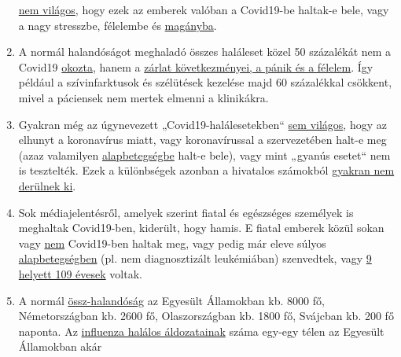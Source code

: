 \begin{enumerate}
  \href{https://www.hsj.co.uk/commissioning/thousands-of-extra-deaths-outside-hospital-not-attributed-to-covid-19/7027459.article}{nem
  világos}, hogy ezek az emberek valóban a Covid19-be haltak-e bele,
  vagy a nagy stresszbe, félelembe és
  \href{http://pflegeethik-initiative.de/2020/04/15/corona-krise-falsche-prioritaeten-gesetzt-und-ethische-prinzipien-verletzt/}{magányba}.
\item
  A normál halandóságot meghaladó összes haláleset közel 50 százalékát
  nem a Covid19
  \href{https://www.thetimes.co.uk/edition/news/coronavirus-record-weekly-death-toll-as-fearful-patients-avoid-hospitals-bm73s2tw3}{okozta},
  hanem a
  \href{https://www.telegraph.co.uk/global-health/science-and-disease/two-new-waves-deaths-break-nhs-new-analysis-warns/}{zárlat
  következményei, a pánik és a félelem}. Így például a szívinfarktusok
  és szélütések kezelése majd 60 százalékkal csökkent, mivel a páciensek
  nem mertek elmenni a klinikákra.
\item
  Gyakran még az úgynevezett „Covid19-halálesetekben``
  \href{https://spectator.us/understand-report-figures-covid-deaths/}{sem
  világos}, hogy az elhunyt a koronavírus miatt, vagy koronavírussal a
  szervezetében halt-e meg (azaz valamilyen
  \href{https://www.youtube.com/watch?v=V0lIWZpiRU0}{alapbetegségbe}
  halt-e bele), vagy mint „gyanús esetet`` nem is tesztelték. Ezek a
  különbségek azonban a hivatalos számokból
  \href{https://swprs.org/rki-relativiert-corona-todesfaelle/}{gyakran
  nem derülnek ki}.
\item
  Sok médiajelentésről, amelyek szerint fiatal és egészséges személyek
  is meghaltak Covid19-ben, kiderült, hogy hamis. E fiatal emberek közül
  sokan vagy
  \href{https://www.dailymail.co.uk/news/article-8193487/Coroner-refuses-rule-COVID-19-cause-death-six-week-old-Connecticut-baby.html}{nem}
  Covid19-ben haltak meg, vagy pedig már eleve súlyos
  \href{https://sports.yahoo.com/spanish-football-coach-francisco-garcia-163153573.html}{alapbetegségben}
  (pl. nem diagnosztizált leukémiában) szenvedtek, vagy
  \href{https://www.tagesanzeiger.ch/bund-muss-in-seiner-todesfallstatistik-fehler-korrigieren-584308129723}{9
  helyett 109 évesek} voltak.
\item
  A normál
  \href{https://www.cdc.gov/mmwr/volumes/68/wr/mm6826a5.htm}{össz-halandóság}
  az Egyesült Államokban kb. 8000 fő, Németországban kb. 2600 fő,
  Olaszországban kb. 1800 fő, Svájcban kb. 200 fő naponta. Az
  \href{https://www.statnews.com/2018/09/26/cdc-us-flu-deaths-winter/}{influenza
  halálos áldozatainak} száma egy-egy télen az Egyesült Államokban akár

\end{enumerate}
